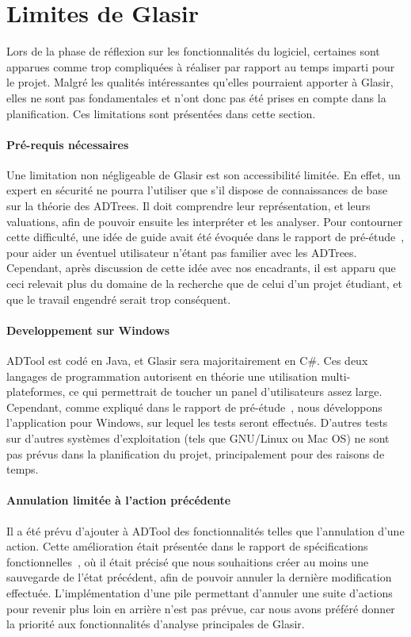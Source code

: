 \section{Limites de Glasir}
    \label{sec:limites}

    Lors de la phase de réflexion sur les fonctionnalités du logiciel, certaines sont apparues comme trop compliquées à réaliser par rapport au temps imparti pour le projet. Malgré les qualités intéressantes qu'elles pourraient apporter à Glasir, elles ne sont pas fondamentales et n'ont donc pas été prises en compte dans la planification. Ces limitations sont présentées dans cette section.

    \paragraph{Pré-requis nécessaires}

    Une limitation non négligeable de Glasir est son accessibilité limitée. En effet, un expert en sécurité ne pourra l'utiliser que s'il dispose de connaissances de base sur la théorie des ADTrees. Il doit comprendre leur représentation, et leurs valuations, afin de pouvoir ensuite les interpréter et les analyser. Pour contourner cette difficulté, une idée de \og guide \fg{} avait été évoquée dans le rapport de pré-étude~\cite{pre_etude}, pour aider un éventuel utilisateur n'étant pas familier avec les ADTrees. Cependant, après discussion de cette idée avec nos encadrants, il est apparu que ceci relevait plus du domaine de la recherche que de celui d'un projet étudiant, et que le travail engendré serait trop conséquent.

    \paragraph{Developpement sur Windows}

    ADTool est codé en Java, et Glasir sera majoritairement en C\#. Ces deux langages de programmation autorisent en théorie une utilisation multi-plateformes, ce qui permettrait de toucher un panel d'utilisateurs assez large. Cependant, comme expliqué dans le rapport de pré-étude~\cite{pre_etude}, nous développons l'application pour Windows, sur lequel les tests seront effectués. D'autres tests sur d'autres systèmes d'exploitation (tels que GNU/Linux ou Mac OS) ne sont pas prévus dans la planification du projet, principalement pour des raisons de temps.

    \paragraph{Annulation limitée à l'action précédente}

    Il a été prévu d'ajouter à ADTool des fonctionnalités telles que l'annulation d'une action. Cette amélioration était présentée dans le rapport de spécifications fonctionnelles~\cite{spec_fonc}, où il était précisé que nous souhaitions créer au moins une sauvegarde de l'état précédent, afin de pouvoir annuler la dernière modification effectuée. L'implémentation d'une pile permettant d'annuler une suite d'actions pour revenir plus loin en arrière n'est pas prévue, car nous avons préféré donner la priorité aux fonctionnalités d'analyse principales de Glasir.